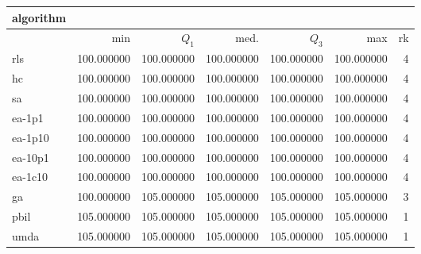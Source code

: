 \begin{tabular}{@{}l*{5}{>{{}}N{3}{0}}>{{}}N{2}{0}@{}}
\toprule
{algorithm} &  \\
\midrule
& {min} & {$Q_1$} & {med.} & {$Q_3$} & {max} & {rk}\\
\midrule
rls & 100.000000 & 100.000000 & 100.000000 & 100.000000 & 100.000000 & 4\\
hc & 100.000000 & 100.000000 & 100.000000 & 100.000000 & 100.000000 & 4\\
sa & 100.000000 & 100.000000 & 100.000000 & 100.000000 & 100.000000 & 4\\
ea-1p1 & 100.000000 & 100.000000 & 100.000000 & 100.000000 & 100.000000 & 4\\
ea-1p10 & 100.000000 & 100.000000 & 100.000000 & 100.000000 & 100.000000 & 4\\
ea-10p1 & 100.000000 & 100.000000 & 100.000000 & 100.000000 & 100.000000 & 4\\
ea-1c10 & 100.000000 & 100.000000 & 100.000000 & 100.000000 & 100.000000 & 4\\
ga & 100.000000 & {\color{blue}} 105.000000 & {\color{blue}} 105.000000 & {\color{blue}} 105.000000 & {\color{blue}} 105.000000 & 3\\
pbil & {\color{blue}} 105.000000 & {\color{blue}} 105.000000 & {\color{blue}} 105.000000 & {\color{blue}} 105.000000 & {\color{blue}} 105.000000 & 1\\
umda & {\color{blue}} 105.000000 & {\color{blue}} 105.000000 & {\color{blue}} 105.000000 & {\color{blue}} 105.000000 & {\color{blue}} 105.000000 & 1\\
\bottomrule
\end{tabular}
